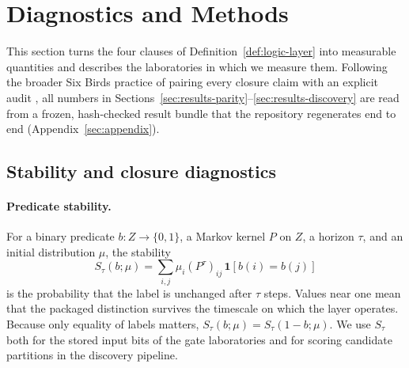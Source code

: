 \section{Diagnostics and Methods}
\label{sec:diagnostics-methods}

This section turns the four clauses of Definition~\ref{def:logic-layer} into measurable quantities and describes the laboratories in which we measure them. Following the broader Six Birds practice of pairing every closure claim with an explicit audit \cite{tsiokos2026countstone,tsiokos2026minsubstrate}, all numbers in Sections~\ref{sec:results-parity}--\ref{sec:results-discovery} are read from a frozen, hash-checked result bundle that the repository regenerates end to end (Appendix~\ref{sec:appendix}).

\subsection{Stability and closure diagnostics}

\paragraph{Predicate stability.} For a binary predicate \(b : Z \to \{0,1\}\), a Markov kernel \(P\) on \(Z\), a horizon \(\tau\), and an initial distribution \(\mu\), the stability
\[
S_\tau(b;\mu)
=
\sum_{i,j} \mu_i (P^\tau)_{ij}\,\mathbf{1}[b(i)=b(j)]
\]
is the probability that the label is unchanged after \(\tau\) steps. Values near one mean that the packaged distinction survives the timescale on which the layer operates. Because only equality of labels matters, \(S_\tau(b;\mu)=S_\tau(1-b;\mu)\). We use \(S_\tau\) both for the stored input bits of the gate laboratories and for scoring candidate partitions in the discovery pipeline.

